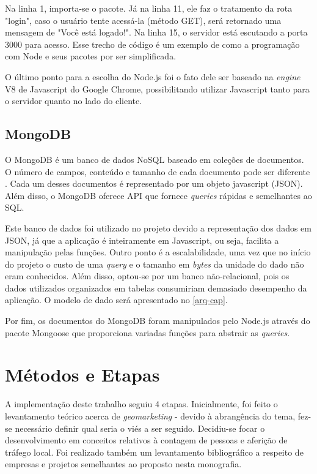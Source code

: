 Na linha 1, importa-se o pacote. Já na linha 11, ele faz o tratamento da rota "login", caso o usuário tente acessá-la (método GET), será retornado uma mensagem de "Você está logado!". Na linha 15, o servidor está escutando a porta 3000 para acesso. Esse trecho de código é um exemplo de como a programação
com Node e seus pacotes por ser simplificada.

O último ponto para a escolha do Node.js foi o fato dele ser baseado na
\emph{engine} V8 de Javascript do Google Chrome, possibilitando utilizar
Javascript tanto para o servidor quanto no lado do cliente.

\subsection{MongoDB}
O MongoDB é um banco de dados NoSQL baseado em coleções de documentos. O número
de campos, conteúdo e tamanho de cada documento pode ser diferente \cite{mongo}.
Cada um desses documentos é representado por um objeto javascript (JSON). Além
disso, o MongoDB oferece API que fornece \emph{queries} rápidas e semelhantes ao
SQL.

Este banco de dados foi utilizado no projeto devido a representação dos dados em
JSON, já que a aplicação é inteiramente em Javascript, ou seja, facilita a
manipulação pelas funções. Outro ponto é a escalabilidade, uma vez que no início
do projeto o custo de uma \emph{query} e o tamanho em \emph{bytes} da unidade do
dado não eram conhecidos. Além disso, optou-se por um banco não-relacional, pois os dados utilizados organizados em tabelas consumiriam demasiado desempenho da aplicação. O modelo de dado será apresentado no \autoref{arq-cap}.

Por fim, os documentos do MongoDB foram manipulados pelo Node.js através do pacote Mongoose que proporciona variadas
funções para abstrair as \emph{queries}.

\section{Métodos e Etapas}
\label{metodos-etapas}

A implementação deste trabalho seguiu 4 etapas. Inicialmente, foi feito o levantamento teórico acerca de \emph{geomarketing} - devido à abrangência do tema, fez-se necessário definir
qual seria o viés a ser seguido. Decidiu-se focar o desenvolvimento em conceitos
relativos à contagem de pessoas e aferição de tráfego local. Foi realizado
também um levantamento bibliográfico a respeito de empresas e projetos
semelhantes ao proposto nesta monografia.

